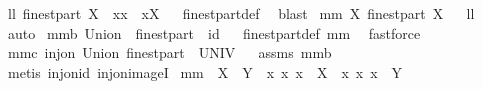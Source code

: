 \begin{isabellebody}
\isanewline
\isanewline
{}\isamarkupfalse%
\ ll{}{}{\isacharcolon}\ {\isachardoublequoteopen}finestpart\ X\ {\isacharequal}\ {\isacharbraceleft}{\isacharbraceleft}x{\isacharbraceright}{\isacharbar}x\ {\isachardot}\ x{\isasymin}X{\isacharbraceright}{\isachardoublequoteclose}%
\isadelimproof
\ %
\endisadelimproof
%
\isatagproof
{}\isamarkupfalse%
\ finestpart{\isacharunderscore}def\ \isamarkupfalse%
\ blast%
\endisatagproof
{\isafoldproof}%
%
\isadelimproof
%
\endisadelimproof
\isanewline
\isanewline
{}\isamarkupfalse%
\ mm{}{}{\isacharcolon}\ {\isachardoublequoteopen}X{\isacharequal}{\isasymUnion}\ {\isacharparenleft}finestpart\ X{\isacharparenright}{\isachardoublequoteclose}%
\isadelimproof
\ %
\endisadelimproof
%
\isatagproof
{}\isamarkupfalse%
\ ll{}{}\ \isamarkupfalse%
\ auto%
\endisatagproof
{\isafoldproof}%
%
\isadelimproof
%
\endisadelimproof
\isanewline
{}\isamarkupfalse%
\ mm{}{}b{\isacharcolon}\ {\isachardoublequoteopen}Union\ {\isasymcirc}\ finestpart\ {\isacharequal}\ id{\isachardoublequoteclose}%
\isadelimproof
\ %
\endisadelimproof
%
\isatagproof
{}\isamarkupfalse%
\ finestpart{\isacharunderscore}def\ mm{}{}\ \isamarkupfalse%
\ fastforce%
\endisatagproof
{\isafoldproof}%
%
\isadelimproof
%
\endisadelimproof
\isanewline
{}\isamarkupfalse%
\ mm{}{}c{\isacharcolon}\ {\isachardoublequoteopen}inj{\isacharunderscore}on\ Union\ {\isacharparenleft}finestpart\ {\isacharbackquote}\ UNIV{\isacharparenright}{\isachardoublequoteclose}%
\isadelimproof
\ %
\endisadelimproof
%
\isatagproof
{}\isamarkupfalse%
\ assms\ mm{}{}b\ \isamarkupfalse%
\ {\isacharparenleft}metis\ inj{\isacharunderscore}on{\isacharunderscore}id\ inj{\isacharunderscore}on{\isacharunderscore}imageI{\isacharparenright}%
\endisatagproof
{\isafoldproof}%
%
\isadelimproof
%
\endisadelimproof
\isanewline
{}\isamarkupfalse%
\ mm{}{}{\isacharcolon}\ \ {\isachardoublequoteopen}X\ {\isasymnoteq}\ Y{\isachardoublequoteclose}\ \ {\isachardoublequoteopen}{\isacharbraceleft}{\isacharbraceleft}x{\isacharbraceright}{\isacharbar}\ x{\isachardot}\ x\ {\isasymin}\ X{\isacharbraceright}\ {\isasymnoteq}\ {\isacharbraceleft}{\isacharbraceleft}x{\isacharbraceright}{\isacharbar}\ x{\isachardot}\ x\ {\isasymin}\ Y{\isacharbraceright}{\isachardoublequoteclose}%

\end{isabellebody}
